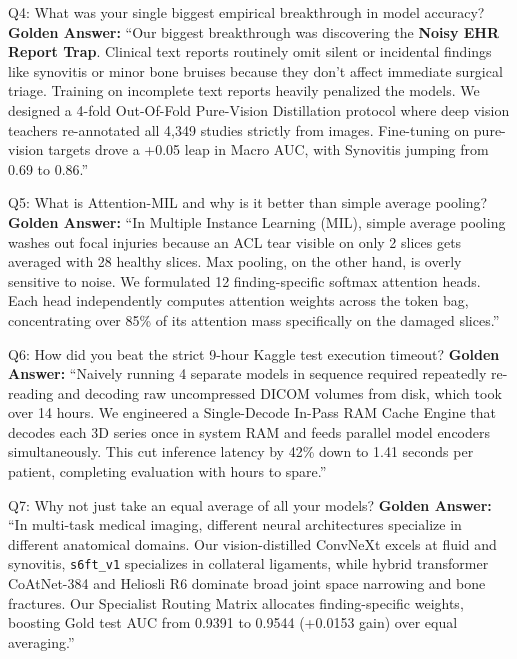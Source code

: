 \documentclass[11pt,a4paper]{article}
\begin{document}
\begin{vivabox}{Q4: What was your single biggest empirical breakthrough in model accuracy?}
\textbf{Golden Answer:} ``Our biggest breakthrough was discovering the \textbf{Noisy EHR Report Trap}. Clinical text reports routinely omit silent or incidental findings like synovitis or minor bone bruises because they don't affect immediate surgical triage. Training on incomplete text reports heavily penalized the models. We designed a 4-fold Out-Of-Fold Pure-Vision Distillation protocol where deep vision teachers re-annotated all 4,349 studies strictly from images. Fine-tuning on pure-vision targets drove a +0.05 leap in Macro AUC, with Synovitis jumping from 0.69 to 0.86.''
\end{vivabox}

\begin{vivabox}{Q5: What is Attention-MIL and why is it better than simple average pooling?}
\textbf{Golden Answer:} ``In Multiple Instance Learning (MIL), simple average pooling washes out focal injuries because an ACL tear visible on only 2 slices gets averaged with 28 healthy slices. Max pooling, on the other hand, is overly sensitive to noise. We formulated 12 finding-specific softmax attention heads. Each head independently computes attention weights across the token bag, concentrating over 85\% of its attention mass specifically on the damaged slices.''
\end{vivabox}

\begin{vivabox}{Q6: How did you beat the strict 9-hour Kaggle test execution timeout?}
\textbf{Golden Answer:} ``Naively running 4 separate models in sequence required repeatedly re-reading and decoding raw uncompressed DICOM volumes from disk, which took over 14 hours. We engineered a Single-Decode In-Pass RAM Cache Engine that decodes each 3D series once in system RAM and feeds parallel model encoders simultaneously. This cut inference latency by 42\% down to 1.41 seconds per patient, completing evaluation with hours to spare.''
\end{vivabox}

\begin{vivabox}{Q7: Why not just take an equal average of all your models?}
\textbf{Golden Answer:} ``In multi-task medical imaging, different neural architectures specialize in different anatomical domains. Our vision-distilled ConvNeXt excels at fluid and synovitis, \texttt{s6ft\_v1} specializes in collateral ligaments, while hybrid transformer CoAtNet-384 and Heliosli R6 dominate broad joint space narrowing and bone fractures. Our Specialist Routing Matrix allocates finding-specific weights, boosting Gold test AUC from 0.9391 to 0.9544 (+0.0153 gain) over equal averaging.''
\end{vivabox}
\end{document}
